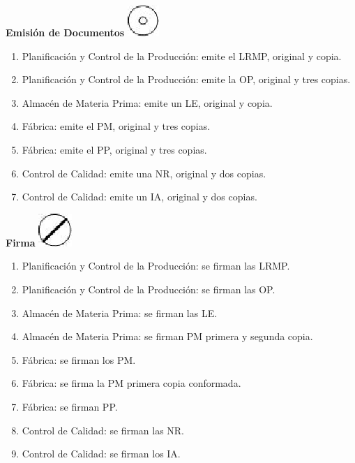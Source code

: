 \begin{center}
  \textbf{Emisión de Documentos}
  \includegraphics{./Images/Simbolos/simbolo-Emision-de-Documentos.png}
\end{center}
\begin{enumerate}
  \item Planificaci\'on y Control de la Producci\'on: emite el LRMP, original y copia.
  \item Planificaci\'on y Control de la Producci\'on: emite la OP, original y tres copias. 
  \item Almac\'en de Materia Prima: emite un LE, original y copia.
  \item F\'abrica: emite el PM, original y tres copias.
  \item F\'abrica: emite el PP, original y tres copias.
  \item Control de Calidad: emite una NR, original y dos copias.
  \item Control de Calidad: emite un IA, original y dos copias.
\end{enumerate}

\begin{center}
  \textbf{Firma}
  \includegraphics{./Images/Simbolos/simbolo-Firma.png}
\end{center}
\begin{enumerate}
  \item Planificaci\'on y Control de la Producci\'on: se firman las LRMP.
  \item Planificaci\'on y Control de la Producci\'on: se firman las OP.
  \item Almac\'en de Materia Prima: se firman las LE.
  \item Almac\'en de Materia Prima: se firman PM primera y segunda copia.
  \item F\'abrica: se firman los PM.
  \item F\'abrica: se firma la PM primera copia conformada.
  \item F\'abrica: se firman PP.
  \item Control de Calidad: se firman las NR.
  \item Control de Calidad: se firman los IA.
\end{enumerate}

